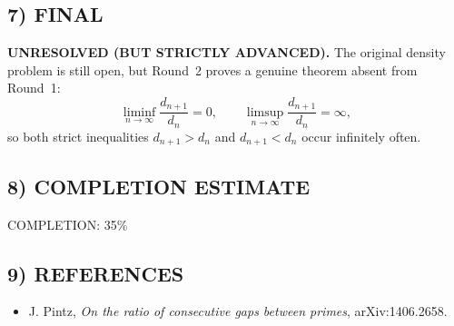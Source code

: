 \subsection*{7) FINAL}
\textbf{UNRESOLVED (BUT STRICTLY ADVANCED).}  The original density problem is still open, but Round~2 proves a genuine theorem absent from Round~1:
\[
\liminf_{n\to\infty}\frac{d_{n+1}}{d_n}=0,
\qquad
\limsup_{n\to\infty}\frac{d_{n+1}}{d_n}=\infty,
\]
so both strict inequalities $d_{n+1}>d_n$ and $d_{n+1}<d_n$ occur infinitely often.

\subsection*{8) COMPLETION ESTIMATE}
COMPLETION: 35\%

\subsection*{9) REFERENCES}
\begin{itemize}
\item J. Pintz, \emph{On the ratio of consecutive gaps between primes}, arXiv:1406.2658.
\end{itemize}


